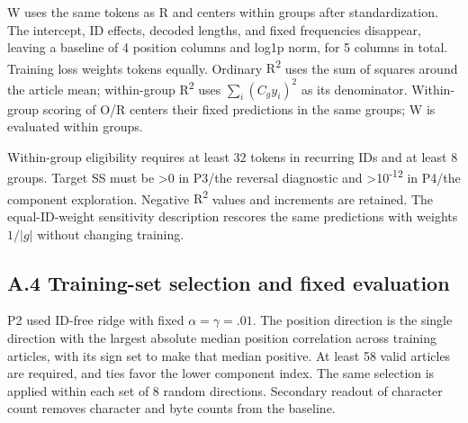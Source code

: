 W uses the same tokens as R and centers within groups after standardization. The intercept, ID effects, decoded lengths, and fixed frequencies disappear, leaving a baseline of 4 position columns and log1p norm, for 5 columns in total. Training loss weights tokens equally. Ordinary {R\textsuperscript{2}} uses the sum of squares around the article mean; within-group {R\textsuperscript{2}} uses \(\sum_i(C_gy_i)^2\) as its denominator. Within-group scoring of O/R centers their fixed predictions in the same groups; W is evaluated within groups.

Within-group eligibility requires at least 32 tokens in recurring IDs and at least 8 groups. Target SS must be \textgreater0 in P3/the reversal diagnostic and {\textgreater10\textsuperscript{-}\textsuperscript{1}\textsuperscript{2}} in P4/the component exploration. Negative {R\textsuperscript{2}} values and increments are retained. The equal-ID-weight sensitivity description rescores the same predictions with weights \(1/|g|\) without changing training.

\FloatBarrier

\subsection{A.4 Training-set selection and fixed evaluation}\label{a.4-training-set-selection-and-fixed-evaluation}

P2 used ID-free ridge with fixed \(\alpha=\gamma=.01\). The position direction is the single direction with the largest absolute median position correlation across training articles, with its sign set to make that median positive. At least 58 valid articles are required, and ties favor the lower component index. The same selection is applied within each set of 8 random directions. Secondary readout of character count removes character and byte counts from the baseline.

